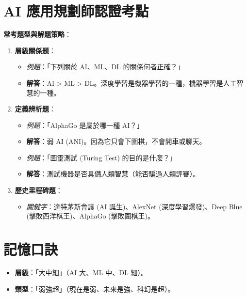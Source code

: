 \documentclass[
  letterpaper,
  DIV=11,
  numbers=noendperiod]{scrreprt}
\providecommand{\tightlist}{%
  \setlength{\itemsep}{0pt}\setlength{\parskip}{0pt}}
\begin{document}
\section{AI
應用規劃師認證考點}\label{ai-ux61c9ux7528ux898fux5283ux5e2bux8a8dux8b49ux8003ux9ede}

\textbf{常考題型與解題策略}：

\begin{enumerate}
\def\labelenumi{\arabic{enumi}.}
\tightlist
\item
  \textbf{層級關係題}：

  \begin{itemize}
  \tightlist
  \item
    \emph{例題}：「下列關於 AI、ML、DL 的關係何者正確？」
  \item
    \textbf{解答}：AI \textgreater{} ML \textgreater{}
    DL。深度學習是機器學習的一種，機器學習是人工智慧的一種。
  \end{itemize}
\item
  \textbf{定義辨析題}：

  \begin{itemize}
  \tightlist
  \item
    \emph{例題}：「AlphaGo 是屬於哪一種 AI？」
  \item
    \textbf{解答}：弱 AI (ANI)。因為它只會下圍棋，不會開車或聊天。
  \item
    \emph{例題}：「圖靈測試 (Turing Test) 的目的是什麼？」
  \item
    \textbf{解答}：測試機器是否具備人類智慧（能否騙過人類評審）。
  \end{itemize}
\item
  \textbf{歷史里程碑題}：

  \begin{itemize}
  \tightlist
  \item
    \emph{關鍵字}：達特茅斯會議 (AI 誕生)、AlexNet (深度學習爆發)、Deep
    Blue (擊敗西洋棋王)、AlphaGo (擊敗圍棋王)。
  \end{itemize}
\end{enumerate}

\section{記憶口訣}\label{ux8a18ux61b6ux53e3ux8a23}

\begin{itemize}
\tightlist
\item
  \textbf{層級}：「大中細」（AI 大、ML 中、DL 細）。
\item
  \textbf{類型}：「弱強超」（現在是弱、未來是強、科幻是超）。
\end{itemize}
\end{document}
